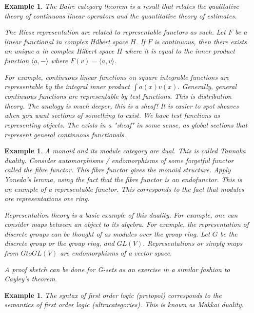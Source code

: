 \documentclass{tufte-book}
\newtheorem{example}[theorem]{Example}
\begin{document}
 \begin{example}
 	The Baire category theorem is a result that relates the qualitative theory of continuous linear operators and the quantitative theory of estimates.
 
 	The Riesz representation are related to representable functors as such. Let $F$ be a linear functional in complex Hilbert space $H$. If $F$ is continuous, then there exists an unique $a$ in complex Hilbert space $H$ where it is equal to the inner product function $\langle a, - \rangle$ where $F(v) = \langle a, v \rangle$.
 
 	For example, continuous linear functions on square integrable functions are representable by the integral inner product $\int a(x) v(x)$. Generally, general continuous functions are representable by test functions. This is distribution theory. The analogy is much deeper, this is a sheaf! It is easier to spot sheaves when you want sections of something to exist. We have test functions as representing objects. The exists in a "sheaf" in some sense, as global sections that represent general continuous functionals.
 \end{example}
 
 \begin{example}
 	A monoid and its module category are dual. This is called Tannaka duality. Consider automorphisms / endomorphisms of some forgetful functor called the fibre functor. This fibre functor gives the monoid structure. Apply Yoneda's lemma, using the fact that the fibre functor is an endofunctor. This is an example of a representable functor. This corresponds to the fact that modules are representations ove ring.
 
 	Representation theory is a basic example of this duality. For example, one can consider maps between an object to its algebra. For example, the representation of discrete groups can be thought of as modules over the group ring. Let $G$ be the discrete group or the group ring, and $GL(V)$. Representations or simply maps from $G to GL(V)$ are endomorphisms of a vector space.
 
 	A proof sketch can be done for G-sets as an exercise in a similar fashion to Cayley's theorem.
 \end{example}
 
 \begin{example}
 	The syntax of first order logic (pretopoi) corresponds to the semantics of first order logic (ultracategories). This is known as Makkai duality.
 \end{example}
 
\end{document}
